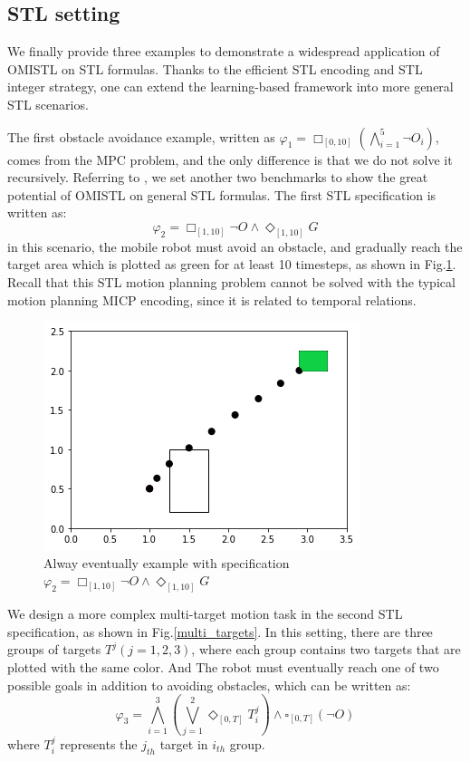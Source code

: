 \documentclass[a4paper]{report}
\begin{document}
\subsection{ STL setting}
We finally provide three examples to demonstrate a  widespread application of  OMISTL on STL formulas.  Thanks to the efficient STL encoding and STL integer strategy, one can extend the learning-based framework into more general STL scenarios.

The first obstacle avoidance example, written as $\varphi_1=\Box_{[0,10]}(\bigwedge_{i=1}^5\lnot O_i)$, comes from the MPC problem, and the only difference is that we do not solve it recursively. Referring to \cite{kurtz2022mixed}, we set another two benchmarks to show the great potential of OMISTL on general STL formulas. The first STL specification is written as:
\begin{equation}
    \varphi_2=\Box_{[1,10]}\lnot O\wedge \Diamond_{[1,10]}G 
\end{equation}
in this scenario, the mobile robot must avoid an obstacle, and gradually reach the target area which is plotted as green for at least 10 timesteps, as shown in Fig.\ref{alway_eventually_route}. Recall that this STL motion planning problem cannot be solved with the typical motion planning MICP encoding, since it is related to temporal relations. 

\begin{figure}
    \centering
    \includegraphics[scale=0.6]{always_eventually_route.png}
    \caption{Alway eventually example with specification $\varphi_2=\Box_{[1,10]}\lnot O\wedge \Diamond_{[1,10]}G $}
    \label{alway_eventually_route}
\end{figure}

We design a more complex multi-target motion task in the second STL specification, as shown in Fig.\ref{multi_targets}. In this setting, there are three groups of targets $T^j (j=1,2,3)$, where each group contains two targets that are plotted with the same color. And The robot must eventually reach one of two possible goals in addition to avoiding obstacles, which can be written as:
\begin{equation}
    \varphi_3=\bigwedge_{i=1}^3\left(\bigvee_{j=1}^2 \Diamond_{[0, T]} T_i^j\right) \wedge \square_{[0, T]}(\neg O)
\end{equation}
where $T_i^j$ represents the $j_{th}$ target in $i_{th}$ group.
\end{document}
